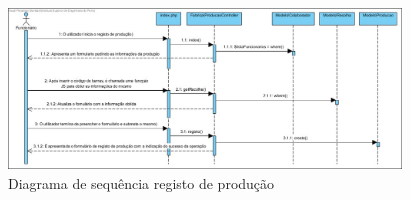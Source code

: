 \begin{figure}[h!] 
	\begin{center}
		\includegraphics[width=0.93\textwidth,keepaspectratio]{figuras/Diagramas_vp/SD_Fabrica_3_Registo_de_Producao.jpg}
		\caption{Diagrama de sequência registo de produção}
		\label{fig:sd_producao} 
	\end{center}
\end{figure}
